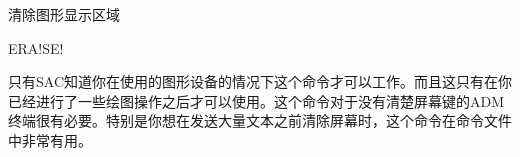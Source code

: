 \label{cmd:erase}

清除图形显示区域

\begin{SACSTX}
ERA!SE!
\end{SACSTX}

只有SAC知道你在使用的图形设备的情况下这个命令才可以工作。而且这只有在你已经进行了一些绘图操作之后才可以使用。这个命令对于没有清楚屏幕键的ADM终端很有必要。特别是你想在发送大量文本之前清除屏幕时，这个命令在命令文件中非常有用。

